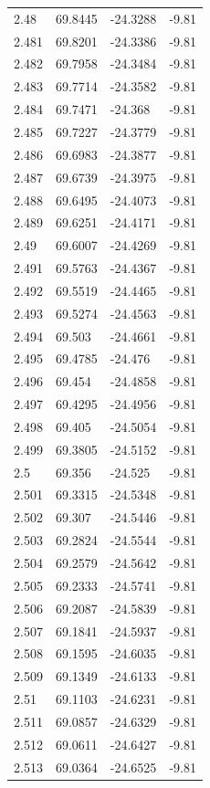 \begin{tabular}{llll}
2.48 & 69.8445 & -24.3288 & -9.81 \\
2.481 & 69.8201 & -24.3386 & -9.81 \\
2.482 & 69.7958 & -24.3484 & -9.81 \\
2.483 & 69.7714 & -24.3582 & -9.81 \\
2.484 & 69.7471 & -24.368 & -9.81 \\
2.485 & 69.7227 & -24.3779 & -9.81 \\
2.486 & 69.6983 & -24.3877 & -9.81 \\
2.487 & 69.6739 & -24.3975 & -9.81 \\
2.488 & 69.6495 & -24.4073 & -9.81 \\
2.489 & 69.6251 & -24.4171 & -9.81 \\
2.49 & 69.6007 & -24.4269 & -9.81 \\
2.491 & 69.5763 & -24.4367 & -9.81 \\
2.492 & 69.5519 & -24.4465 & -9.81 \\
2.493 & 69.5274 & -24.4563 & -9.81 \\
2.494 & 69.503 & -24.4661 & -9.81 \\
2.495 & 69.4785 & -24.476 & -9.81 \\
2.496 & 69.454 & -24.4858 & -9.81 \\
2.497 & 69.4295 & -24.4956 & -9.81 \\
2.498 & 69.405 & -24.5054 & -9.81 \\
2.499 & 69.3805 & -24.5152 & -9.81 \\
2.5 & 69.356 & -24.525 & -9.81 \\
2.501 & 69.3315 & -24.5348 & -9.81 \\
2.502 & 69.307 & -24.5446 & -9.81 \\
2.503 & 69.2824 & -24.5544 & -9.81 \\
2.504 & 69.2579 & -24.5642 & -9.81 \\
2.505 & 69.2333 & -24.5741 & -9.81 \\
2.506 & 69.2087 & -24.5839 & -9.81 \\
2.507 & 69.1841 & -24.5937 & -9.81 \\
2.508 & 69.1595 & -24.6035 & -9.81 \\
2.509 & 69.1349 & -24.6133 & -9.81 \\
2.51 & 69.1103 & -24.6231 & -9.81 \\
2.511 & 69.0857 & -24.6329 & -9.81 \\
2.512 & 69.0611 & -24.6427 & -9.81 \\
2.513 & 69.0364 & -24.6525 & -9.81 \\

\end{tabular}
